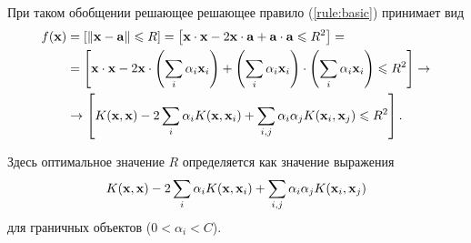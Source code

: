 При таком обобщении решающее решающее правило (\ref{rule:basic}) принимает вид 
\begin{align}
	\label{rule:kernel}
	f(\mb x) 
		&= 	\sbr{\norm{\mb x-\mb a} \le R} 
		= 	\sbr{\mb x\cdot\mb x - 2\mb x\cdot\mb a + \mb a\cdot\mb a \le R^2} = \notag \\
		&= 	\sbr{\mb x\cdot\mb x - 2\mb x\cdot\cbr{\suml_{i} \alpha_i \mb x_i} + \cbr{\suml_{i} \alpha_i \mb x_i}\cdot\cbr{\suml_{i} \alpha_i \mb x_i} \le R^2} \to \notag \\
		&\to \sbr{K(\mb x,\mb x) - 2\suml_{i} \alpha_i K(\mb x, \mb x_i) + \suml_{i,j} \alpha_i\alpha_jK(\mb x_i,\mb x_j) \le R^2}.
\end{align}

Здесь оптимальное значение $R$ определяется как значение выражения $$K(\boldsymbol{\mathbf{x}},\boldsymbol{\mathbf{x}}) - 2\sum\limits_{i} \alpha_i K(\boldsymbol{\mathbf{x}}, \boldsymbol{\mathbf{x}}_i) + \sum\limits_{i,j} \alpha_i\alpha_jK(\boldsymbol{\mathbf{x}}_i,\boldsymbol{\mathbf{x}}_j)$$ для граничных объектов ($0<\alpha_i<C$).
